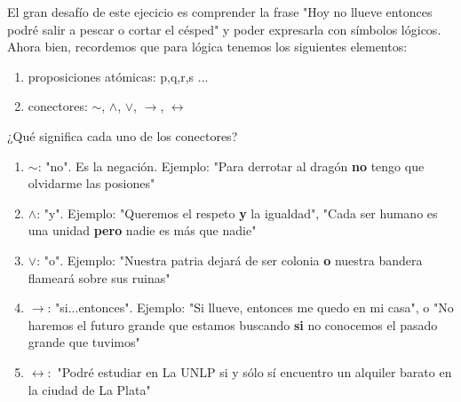     El gran desafío de este ejecicio es comprender la frase "Hoy no llueve entonces podré salir a pescar o cortar el césped" y poder expresarla con símbolos lógicos. Ahora bien, recordemos que para lógica tenemos los siguientes elementos:
    
    \begin{enumerate}
        \item proposiciones atómicas: p,q,r,s ...
        \item conectores: $\sim$, $\wedge$, $\vee$, $\to$, $\leftrightarrow$
    \end{enumerate}
    
    ¿Qué significa cada uno de los conectores?
    \begin{enumerate}
        \item  $\sim$: "no". Es la negación. Ejemplo: "Para derrotar al dragón  \textbf{no} tengo que olvidarme las posiones"
        \item  $\wedge$: "y". Ejemplo: "Queremos el respeto \textbf{y} la igualdad", "Cada ser humano es una unidad \textbf{pero} nadie es más que nadie"
        \item  $\vee$: "o". Ejemplo: "Nuestra patria dejará de ser colonia \textbf{o} nuestra bandera flameará sobre sus ruinas"
        \item  $\to$: "si...entonces". Ejemplo: "Si llueve, entonces me quedo en mi casa", o "No haremos el futuro grande que estamos buscando \textbf{si} no conocemos el pasado grande que tuvimos"
        \item  $\leftrightarrow: $ "Podré estudiar en La UNLP si y sólo sí encuentro un alquiler barato en la ciudad de La Plata"
    \end{enumerate}
    
    